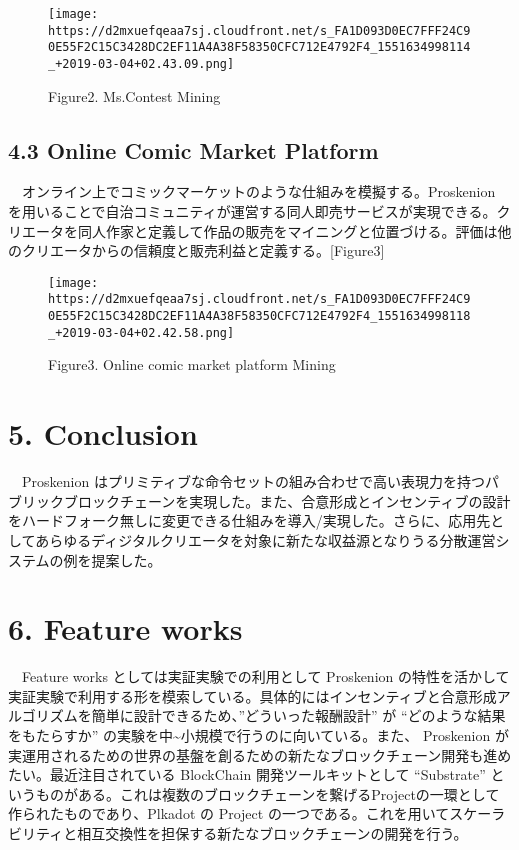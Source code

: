 \begin{figure}
\centering
\texttt{[image: https://d2mxuefqeaa7sj.cloudfront.net/s\_FA1D093D0EC7FFF24C90E55F2C15C3428DC2EF11A4A38F58350CFC712E4792F4\_1551634998114\_+2019-03-04+02.43.09.png]}
\caption{Figure2. Ms.Contest Mining}
\end{figure}

\hypertarget{online-comic-market-platform}{%
\subsection{4.3 Online Comic Market
Platform}\label{online-comic-market-platform}}

　オンライン上でコミックマーケットのような仕組みを模擬する。Proskenion
を用いることで自治コミュニティが運営する同人即売サービスが実現できる。クリエータを同人作家と定義して作品の販売をマイニングと位置づける。評価は他のクリエータからの信頼度と販売利益と定義する。{[}Figure3{]}

\begin{figure}
\centering
\texttt{[image: https://d2mxuefqeaa7sj.cloudfront.net/s\_FA1D093D0EC7FFF24C90E55F2C15C3428DC2EF11A4A38F58350CFC712E4792F4\_1551634998118\_+2019-03-04+02.42.58.png]}
\caption{Figure3. Online comic market platform Mining}
\end{figure}

\hypertarget{conclusion}{%
\section{5. Conclusion}\label{conclusion}}

　Proskenion
はプリミティブな命令セットの組み合わせで高い表現力を持つパブリックブロックチェーンを実現した。また、合意形成とインセンティブの設計をハードフォーク無しに変更できる仕組みを導入/実現した。さらに、応用先としてあらゆるディジタルクリエータを対象に新たな収益源となりうる分散運営システムの例を提案した。

\hypertarget{feature-works}{%
\section{6. Feature works}\label{feature-works}}

　Feature works としては実証実験での利用として Proskenion
の特性を活かして実証実験で利用する形を模索している。具体的にはインセンティブと合意形成アルゴリズムを簡単に設計できるため、''どういった報酬設計''
が ``どのような結果をもたらすか''
の実験を中\textasciitilde 小規模で行うのに向いている。また、 Proskenion
が実運用されるための世界の基盤を創るための新たなブロックチェーン開発も進めたい。最近注目されている
BlockChain 開発ツールキットとして ``Substrate''
というものがある。これは複数のブロックチェーンを繋げるProjectの一環として作られたものであり、Plkadot
の Project
の一つである。これを用いてスケーラビリティと相互交換性を担保する新たなブロックチェーンの開発を行う。

